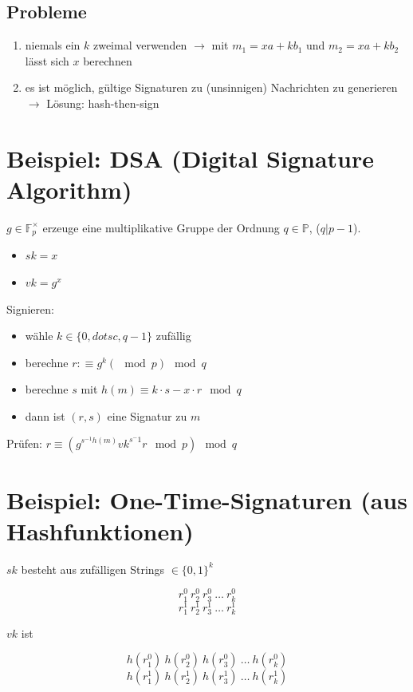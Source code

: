\documentclass[a4paper,twoside,DIV15,BCOR12mm]{scrbook}
\begin{document}
\subsection{Probleme}

\begin{enumerate}
	\item niemals ein $k$ zweimal verwenden $\rightarrow$ mit $m_1 = xa +kb_1$ und $m_2 = xa + kb_2$ lässt sich $x$ berechnen
	\item es ist möglich, gültige Signaturen zu (unsinnigen) Nachrichten zu generieren $\rightarrow$ Lösung: hash-then-sign
\end{enumerate}

\section{Beispiel: DSA (Digital Signature Algorithm)}

$g \in \mathbb{F}_p^\times$ erzeuge eine multiplikative Gruppe der Ordnung $q \in \mathbb{P}$, ($q | p-1$).

\begin{itemize}
	\item $sk = x$
	\item $vk = g^x$
\end{itemize}

Signieren:

\begin{itemize}
	\item wähle $k \in \{0, dotsc, q-1\}$ zufällig
	\item berechne $r :\equiv g^k (\mod{p}) \mod{q}$
	\item berechne $s$ mit $h(m) \equiv k\cdot s - x \cdot r \mod{q}$
	\item dann ist $(r,s)$ eine Signatur zu $m$
\end{itemize}

Prüfen: $r \equiv (g^{s^{-1}h(m)} vk^{s^-1}r \mod{p}) \mod{q}$

\section{Beispiel: One-Time-Signaturen (aus Hashfunktionen)}
		
$sk$ besteht aus zufälligen Strings $\in {\{0,1 \}}^k$

$$r_1^0\ r_2^0\ r_3^0\ \ldots\ r_k^0$$
$$r_1^1\ r_2^1\ r_3^1\ \ldots\ r_k^1$$

$vk$ ist

$$h(r_1^0)\ h(r_2^0)\ h(r_3^0)\ \ldots\ h(r_k^0)$$
$$h(r_1^1)\ h(r_2^1)\ h(r_3^1)\ \ldots\ h(r_k^1)$$
\end{document}
